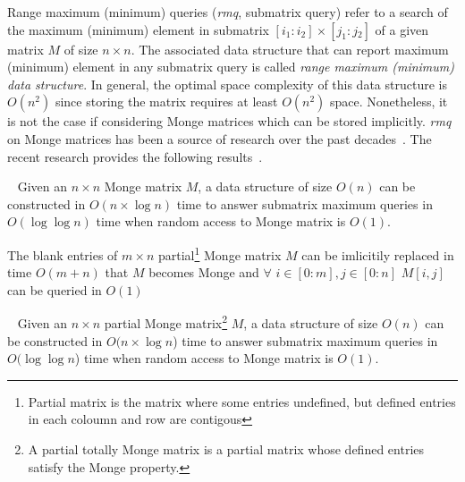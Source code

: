 Range maximum (minimum) que\-ries (\emph{rmq}, submatrix query) refer to a search of the maximum (minimum) element in submatrix $[i_{1}:i{_2}]\times [j_{1}:j{_2}]$ of a given matrix $M$ of size $n \times n$.
The associated data structure that can report maximum (minimum) element in any submatrix query is called \emph{range maximum (minimum) data structure}.
In general, the optimal space complexity of this data structure is $O(n^2)$ since storing the matrix requires at least $O(n^2)$ space.
Nonetheless, it is not the case if considering Monge matrices which can be stored implicitly.
\emph{rmq} on Monge matrices has been a source of research over the past decades~\cite{}.
The recent research provides the following results~\cite{.}.

\begin{theorem}~\cite{.}
Given an $n \times n$ Monge matrix $M$, a data structure of size $O(n)$ can be constructed in $O(n \times \log n)$ time to answer submatrix maximum queries in $O(\log \log n)$ time when random access to Monge matrix is $O(1)$.
\end{theorem}


\begin{lemma}\label{lemma}
The blank entries of  $m \times n $ partial\footnote{Partial matrix is the matrix where some entries undefined, but defined entries in each coloumn and row are contigous} Monge matrix $M$
can be imlicitily replaced in time $O(m+n)$ that 
$M$ becomes Monge and $\forall$ $i \in [0:m],j \in [0:n]$ $M[i,j]$ 
can be queried in $O(1)$ 
\end{lemma}
\begin{theorem}~\cite{.}\label{partialTheorem}
Given an $n \times n$ partial Monge matrix\footnote{A partial totally Monge matrix is a partial matrix whose defined entries satisfy the Monge property.} $M$, a data structure of size $O(n)$ can be constructed in $O(n \times \log n$) time to answer submatrix maximum queries in $O(\log \log n$) time when random access to Monge matrix is $O(1)$.
\end{theorem}

